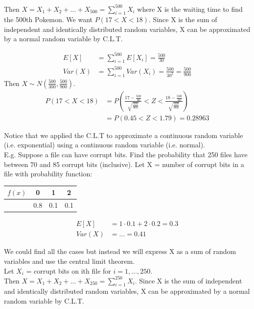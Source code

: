 \documentclass[12pt, letterpaper]{article}
\begin{document}
Then $X = X_1 + X_2 + ... + X_{500} = \sum\limits_{i = 1}^{500} X_i$ where X is the waiting time to find the 500th Pokemon. We want $P\left(17 < X < 18\right)$. Since X is the sum of independent and identically distributed random variables, X can be approximated by a normal random variable by C.L.T.

\begin{align*}
E[X] &= \sum_{i = 1}^{500} E[X_i] = \frac{500}{30}\\
Var\left(X\right) &= \sum_{i = 1}^{500} Var\left(X_i\right) = \frac{500}{30^2} = \frac{500}{900}
\end{align*}
Then $X \sim N(\frac{500}{300}, \frac{500}{900})$.
\begin{align*}
P\left(17 < X < 18\right) &= P\left(\frac{17 - \frac{500}{30}}{\sqrt{\frac{500}{900}}} < Z < \frac{18 - \frac{500}{30}}{\sqrt{\frac{500}{900}}}\right)\\
&= P\left(0.45 < Z < 1.79\right) = 0.28963
\end{align*}

Notice that we applied the C.L.T to approximate a continuous random variable (i.e. exponential) using a continuous random variable (i.e. normal).\\

E.g. Suppose a file can have corrupt bits. Find the probability that 250 files have between 70 and 85 corrupt bits (inclusive). Let X = number of corrupt bits in a file with probability function:\\

\begin{tabular}{|c|c|c|c|}
\hline
$f\left(x\right)$ & 0 & 1 & 2\\ 
\hline
& 0.8 & 0.1 & 0.1\\
\hline
\end{tabular}

\begin{align*}
E[X] &= 1 \cdot 0.1 + 2 \cdot 0.2 = 0.3\\
Var\left(X\right) &= ... = 0.41
\end{align*}

We could find all the cases but instead we will express X as a sum of random variables and use the central limit theorem.\\

Let $X_i$ = corrupt bits on ith file for $i = 1, ..., 250$.\\

Then $X = X_1 + X_2 + ... + X_{250} = \sum\limits_{i = 1}^{250} X_i$. Since X is the sum of independent and identically distributed random variables, X can be approximated by a normal random variable by C.L.T.
\end{document}
